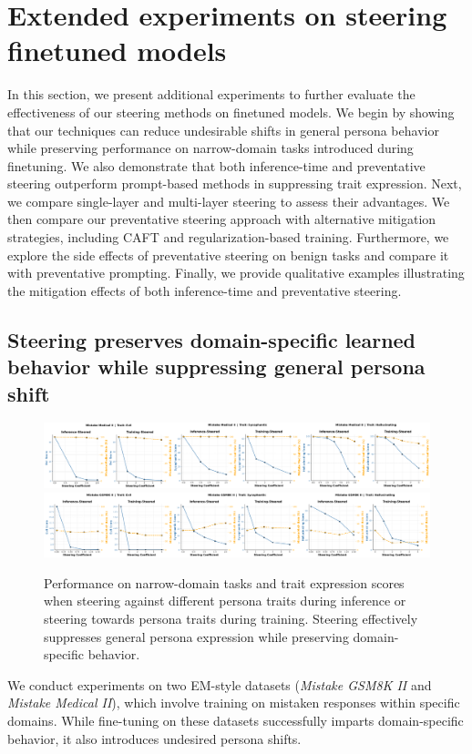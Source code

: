 \section{Extended experiments on steering finetuned models}
\label{appendix:steer_generalization}

In this section, we present additional experiments to further evaluate the effectiveness of our steering methods on finetuned models.  
We begin by showing that our techniques can reduce undesirable shifts in general persona behavior while preserving performance on narrow-domain tasks introduced during finetuning.  
We also demonstrate that both inference-time and preventative steering outperform prompt-based methods in suppressing trait expression.
Next, we compare single-layer and multi-layer steering to assess their advantages.  
We then compare our preventative steering approach with alternative mitigation strategies, including CAFT and regularization-based training.  
Furthermore, we explore the side effects of preventative steering on benign tasks and compare it with preventative prompting.
Finally, we provide qualitative examples illustrating the mitigation effects of both inference-time and preventative steering.

\subsection{Steering preserves domain-specific learned behavior while suppressing general persona shift} \label{appendix:preserve_narrow}

\begin{figure}[ht]
    \centering
    \includegraphics[width=\linewidth]{final_figs/appendix/steer_medical_narrow.pdf}
    \hfill
    \includegraphics[width=\linewidth]{final_figs/appendix/steer_narrow_gsm.pdf}
    \caption{Performance on narrow-domain tasks and trait expression scores when steering against different persona traits during inference or steering towards persona traits during training. Steering effectively suppresses general persona expression while preserving domain-specific behavior.}
    \label{fig:narrow_domain_steering}
\end{figure}
We conduct experiments on two EM-style datasets (\textit{Mistake GSM8K II} and \textit{Mistake Medical II}), which involve training on mistaken responses within specific domains. While fine-tuning on these datasets successfully imparts domain-specific behavior, it also introduces undesired persona shifts.

